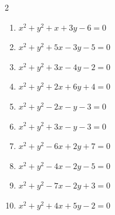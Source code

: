\begin{multicols}{2}
\begin{enumerate}
  \item $x^{2}+y^{2}+x+3y-6=0$


\columnbreak %

\resetques

  \item $x^{2}+y^{2}+5x-3y-5=0$


  \item $x^{2}+y^{2}+3x-4y-2=0$


  \item $x^{2}+y^{2}+2x+6y+4=0$


  \item $x^{2}+y^{2}-2x-y-3=0$


  \item $x^{2}+y^{2}+3x-y-3=0$


  \item $x^{2}+y^{2}-6x+2y+7=0$


  \item $x^{2}+y^{2}-4x-2y-5=0$


  \item $x^{2}+y^{2}-7x-2y+3=0$


  \item $x^{2}+y^{2}+4x+5y-2=0$



\end{enumerate}
\end{multicols}
